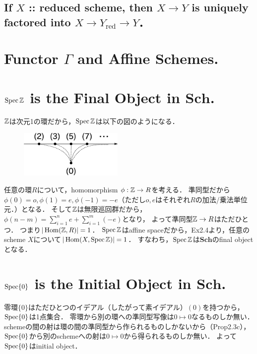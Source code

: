 \documentclass[a4paper]{jsarticle}
\newcommand{\Sch}{\mathbf{Sch}}
\newcommand{\red}[1]{#1_{\text{red}}}
\begin{document}
    \subsection{If $X$ :: reduced scheme, then $X \to Y$ is uniquely factored into $X \to \red{Y} \to Y$．}

\section{Functor $\Gamma$ and Affine Schemes.} %

\section{$\operatorname{Spec} \mathbb{Z}$ is the Final Object in $\Sch$.} %
    $\mathbb{Z}$は次元1の環だから，$\operatorname{Spec} \mathbb{Z}$は以下の図のようになる．
    \begin{figure}[h]
    \begin{center}
        \includegraphics[width=5cm]{./images/SpecZ.eps}
    \end{center}
    \end{figure}

    任意の環$R$について，homomorphism $\phi: \mathbb{Z} \to R$を考える．
    準同型だから$\phi(0)=o, \phi(1)=e, \phi(-1)=-e$（ただし$o, e$はそれぞれ$R$の加法/乗法単位元．）となる．
    そして$\mathbb{Z}$は無限巡回群だから，$\phi(n-m)=\sum_{i=1}^n e+\sum_{i=1}^{m} (-e)$となり，
    よって準同型$\mathbb{Z} \to R$はただひとつ．
    つまり$|\operatorname{Hom}(\mathbb{Z}, R)|=1$．
    $\operatorname{Spec} \mathbb{Z}$はaffine spaceだから，Ex2.4より，任意のscheme $X$について$|\operatorname{Hom}(X, \operatorname{Spec} \mathbb{Z})|=1$．
    すなわち，$\operatorname{Spec} \mathbb{Z}$は$\Sch$のfinal objectとなる．

\section{$\operatorname{Spec} \{0\}$ is the Initial Object in $\Sch$.} %
    零環$\{0\}$はただひとつのイデアル（したがって素イデアル）$(0)$を持つから，$\operatorname{Spec} \{0\}$は1点集合．
    零環から別の環への準同型写像は$0 \mapsto 0$なるものしか無い．
    schemeの間の射は環の間の準同型から作られるものしかないから（Prop2.3c），
    $\operatorname{Spec} \{0\}$から別のschemeへの射は$0 \mapsto 0$から得られるものしか無い．
    よって$\operatorname{Spec} \{0\}$はinitial object．
\end{document}
